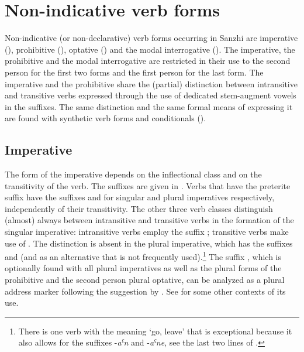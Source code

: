 \chapter{Non-indicative verb forms}
\label{cpt:verbs-nondeclarative}

Non-indicative (or non-declarative) verb forms occurring in Sanzhi are imperative (), prohibitive (), optative () and the modal interrogative (). The imperative, the prohibitive and the modal interrogative are restricted in their use to the second person for the first two forms and the first person for the last form. The imperative and the prohibitive share the (partial) distinction between intransitive and transitive verbs expressed through the use of dedicated stem-augment vowels in the suffixes. The same distinction and the same formal means of expressing it are found with synthetic verb forms and conditionals ().



\section{Imperative}
\label{sec:imperative}

The form of the imperative depends on the inflectional class and on the transitivity of the verb. The suffixes are given in . Verbs that have the preterite suffix  have the suffixes  and  for singular and plural imperatives respectively, independently of their transitivity. The other three verb classes distinguish (almost) always between intransitive and transitive verbs in the formation of the singular imperative: intransitive verbs employ the suffix ; transitive verbs make use of . The distinction is absent in the plural imperative, which has the suffixes and  (and  as an alternative that is not frequently used).\footnote{There is one verb with the meaning `go, leave' that is exceptional because it also allows for the suffixes -\textit{aˁn} and -\textit{aˁne}, see the last two lines of .} The suffix , which is optionally found with all plural imperatives as well as the plural forms of the prohibitive and the second person plural optative, can be analyzed as a plural address marker following the suggestion by \citet[163]{Sumbatova.Lander2014}. See  for some other contexts of its use.


